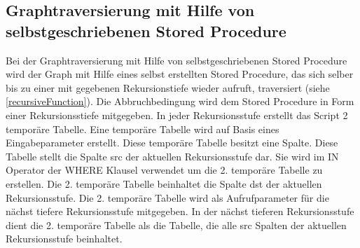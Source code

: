 \subsection{Graphtraversierung mit Hilfe von selbstgeschriebenen Stored Procedure}
Bei der Graphtraversierung mit Hilfe von selbstgeschriebenen Stored Procedure wird der Graph mit Hilfe eines selbst erstellten Stored Procedure, das sich selber bis
zu einer mit gegebenen Rekursionstiefe wieder aufruft, traversiert (siehe \ref{recursiveFunction}). Die Abbruchbedingung wird dem Stored Procedure in Form einer
Rekursionsstiefe mitgegeben. In jeder Rekursionsstufe erstellt das Script 2 temporäre Tabelle. Eine temporäre Tabelle wird auf Basis eines Eingabeparameter erstellt.
Diese temporäre Tabelle besitzt eine Spalte. Diese Tabelle stellt die Spalte src der aktuellen Rekursionsstufe dar. Sie wird im IN Operator der WHERE Klausel verwendet
um die 2. temporäre Tabelle zu erstellen. Die 2. temporäre Tabelle beinhaltet die Spalte dst der aktuellen Rekursionsstufe. Die 2. temporäre Tabelle wird als
Aufrufparameter für die nächst tiefere Rekursionsstufe mitgegeben. In der nächst tieferen Rekursionsstufe dient die 2. temporäre Tabelle als die Tabelle, die alle
src Spalten der aktuellen Rekursionsstufe beinhaltet.

